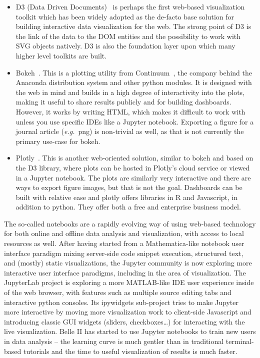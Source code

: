 \documentclass[12pt,a4paper]{article}
\begin{document}
\begin{itemize}
\item D3 (Data Driven Documents)~\cite{D32011} is perhaps the first web-based visualization toolkit which has been widely
adopted as the de-facto base solution for building interactive data visualization for the web. The strong point of D3 is the
link of the data to the DOM entities and the possibility to work with SVG objects natively. D3 is also the foundation layer
upon which many higher level toolkits are built.

\item Bokeh~\cite{Bokeh2014}. This is a plotting utility from Continuum~\cite{continuum}, the company behind the
Anaconda distribution system and other python modules. It is designed with the web in mind and builds in a high degree of
interactivity into the plots, making it useful to share results publicly and for building dashboards. However, it works by
writing HTML, which makes it difficult to work with unless you use specific IDEs like a Jupyter notebook. Exporting a figure
for a journal article ({\it e.g.}\ png) is non-trivial as well, as that is not currently the primary use-case for bokeh.

\item Plotly~\cite{Plotly2015}. This is another web-oriented solution, similar to bokeh and based on the D3 library, where plots
can be hosted in Plotly’s cloud service or viewed in a Jupyter notebook. The plots are similarly very interactive and there
are ways to export figure images, but that is not the goal. Dashboards can be built with relative ease and plotly offers
libraries in R and Javascript, in addition to python. They offer both a free and enterprise business model.
\end{itemize}

The so-called notebooks are a rapidly evolving way of using web-based technology for both online and offline data analysis and
visualization, with access to local resources as well. After having started from a Mathematica-like notebook user interface
paradigm mixing server-side code snippet execution, structured text, and (mostly) static visualizations, the Jupyter community
is now exploring more interactive user interface paradigms, including in the area of visualization. The JupyterLab project is
exploring a more MATLAB-like IDE user experience inside of the web browser, with features such as multiple source editing tabs
and interactive python consoles. Its ipywidgets sub-project tries to make Jupyter more interactive by moving more visualization
work to client-side Javascript and introducing classic GUI widgets (sliders, checkboxes…) for interacting with the live visualization.
Belle II has started to use Jupyter notebooks to train new users in data analysis – the learning curve is much gentler than in
traditional terminal-based tutorials and the time to useful visualization of results is much faster.
\end{document}
